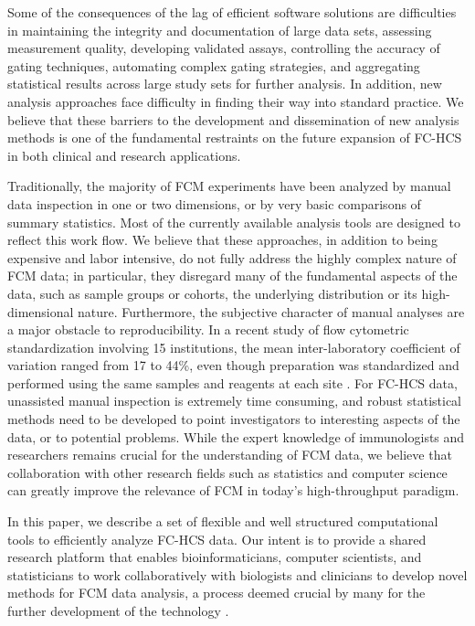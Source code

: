 \documentclass[10pt]{bmc_article}
\newenvironment{bmcformat}{\begin{raggedright}\baselineskip20pt\sloppy\setboolean{publ}{false}}{\end{raggedright}\baselineskip20pt\sloppy}
\begin{document}
\begin{bmcformat}
Some of the consequences of the lag of efficient software solutions
are difficulties in maintaining the integrity and documentation of
large data sets, assessing measurement quality, developing validated
assays, controlling the accuracy of gating techniques, automating
complex gating strategies, and aggregating statistical results across
large study sets for further analysis. In addition, new analysis
approaches face difficulty in finding their way into standard
practice. We believe that these barriers to the development and
dissemination of new analysis methods is one of the fundamental
restraints on the future expansion of FC-HCS in both clinical and
research applications.

Traditionally, the majority of FCM experiments have been analyzed by
manual data inspection in one or two dimensions, or by very basic
comparisons of summary statistics. Most of the currently available
analysis tools are designed to reflect this work flow.  We believe
that these approaches, in addition to being expensive and labor
intensive, do not fully address the highly complex nature of FCM data;
in particular, they disregard many of the fundamental aspects of the
data, such as sample groups or cohorts, the underlying distribution or
its high-dimensional nature. Furthermore, the subjective character of
manual analyses are a major obstacle to reproducibility. In a recent
study of flow cytometric standardization involving 15 institutions,
the mean inter-laboratory coefficient of variation ranged from 17 to
44\%, even though preparation was standardized and performed using the
same samples and reagents at each site \cite{Maecker2005}. For FC-HCS
data, unassisted manual inspection is extremely time consuming, and
robust statistical methods need to be developed to point investigators
to interesting aspects of the data, or to potential problems. While
the expert knowledge of immunologists and researchers remains crucial
for the understanding of FCM data, we believe that collaboration with
other research fields such as statistics and computer science can
greatly improve the relevance of FCM in today's high-throughput
paradigm.

In this paper, we describe a set of flexible and well structured
computational tools to efficiently analyze FC-HCS data. Our intent is
to provide a shared research platform that enables bioinformaticians,
computer scientists, and statisticians to work collaboratively with
biologists and clinicians to develop novel methods for FCM data
analysis, a process deemed crucial by many for the further development
of the technology \cite{lizard2007fca}.


\end{bmcformat}
\end{document}
